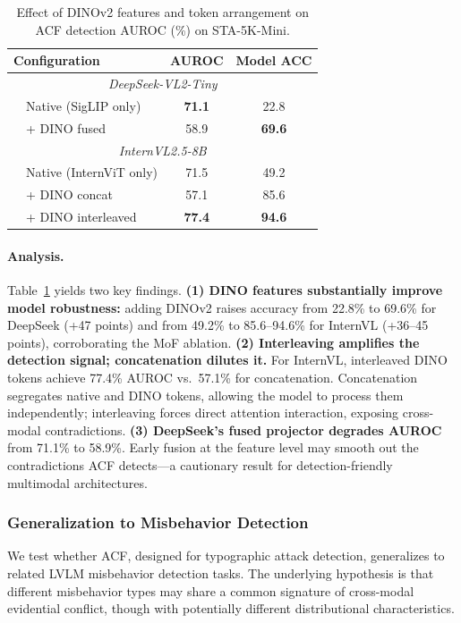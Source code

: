 \documentclass[preprint,12pt]{elsarticle}
\begin{document}
\begin{table}[t]
\centering
\caption{Effect of DINOv2 features and token arrangement on ACF detection AUROC (\%) on STA-5K-Mini.}
\label{tab:mof_interleave}
\setlength{\tabcolsep}{4pt}
\begin{tabular}{@{}l c c@{}}
\toprule
Configuration & AUROC & Model ACC \\
\midrule
\multicolumn{3}{c}{\textit{DeepSeek-VL2-Tiny}} \\
~~Native (SigLIP only)   & \textbf{71.1} & 22.8 \\
~~+ DINO fused           & 58.9 & \textbf{69.6} \\
\midrule
\multicolumn{3}{c}{\textit{InternVL2.5-8B}} \\
~~Native (InternViT only)& 71.5 & 49.2 \\
~~+ DINO concat          & 57.1 & 85.6 \\
~~+ DINO interleaved     & \textbf{77.4} & \textbf{94.6} \\
\bottomrule
\end{tabular}
\end{table}

\paragraph{Analysis.} Table~\ref{tab:mof_interleave} yields two key findings. \textbf{(1) DINO features substantially improve model robustness:} adding DINOv2 raises accuracy from 22.8\% to 69.6\% for DeepSeek (+47 points) and from 49.2\% to 85.6--94.6\% for InternVL (+36--45 points), corroborating the MoF ablation. \textbf{(2) Interleaving amplifies the detection signal; concatenation dilutes it.} For InternVL, interleaved DINO tokens achieve 77.4\% AUROC vs.\ 57.1\% for concatenation. Concatenation segregates native and DINO tokens, allowing the model to process them independently; interleaving forces direct attention interaction, exposing cross-modal contradictions. \textbf{(3) DeepSeek's fused projector degrades AUROC} from 71.1\% to 58.9\%. Early fusion at the feature level may smooth out the contradictions ACF detects---a cautionary result for detection-friendly multimodal architectures.

\subsubsection{Generalization to Misbehavior Detection}
\label{sec:misbehavior}

We test whether ACF, designed for typographic attack detection, generalizes to related LVLM misbehavior detection tasks. The underlying hypothesis is that different misbehavior types may share a common signature of cross-modal evidential conflict, though with potentially different distributional characteristics.
\end{document}
